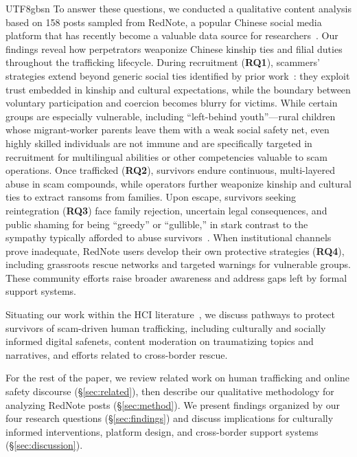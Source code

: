 \documentclass[sigconf,nonacm]{acmart}
\newcommand{\rev}[1]{#1}
\begin{document}
\begin{CJK}{UTF8}{gbsn}
To answer these questions, we conducted a qualitative content analysis based on 158 posts sampled from RedNote, \rev{a popular Chinese social media platform that has recently become a valuable data source for researchers}~\cite{wan-chi25, deng-deng25, yuan2025love}. Our findings \rev{reveal how perpetrators weaponize Chinese kinship ties and filial duties throughout the trafficking lifecycle. During recruitment (\textbf{RQ1}), scammers' strategies extend beyond generic social ties identified by prior work~\cite{luong2025simple, lazarus2025assessing}: they exploit trust embedded in kinship and cultural expectations, while the boundary between voluntary participation and coercion becomes blurry for victims. While certain groups are especially vulnerable, including ``left-behind youth''---rural children whose migrant-worker parents leave them with a weak social safety net, even highly skilled individuals are not immune and are specifically targeted in recruitment for multilingual abilities or other competencies valuable to scam operations. Once trafficked (\textbf{RQ2}), survivors endure continuous, multi-layered abuse in scam compounds, while operators further weaponize kinship and cultural ties to extract ransoms from families. Upon escape, survivors seeking reintegration (\textbf{RQ3}) face family rejection, uncertain legal consequences, and public shaming for being ``greedy'' or ``gullible,'' in stark contrast to the sympathy typically afforded to abuse survivors~\cite{pevac2022online}. When institutional channels prove inadequate, RedNote users develop their own protective strategies (\textbf{RQ4}), including grassroots rescue networks and targeted warnings for vulnerable groups. These community efforts raise broader awareness and address gaps left by formal support systems.} 

Situating our work within the HCI literature~\cite{wash2020experts, razaq2021we, randazzo2023if, starbird2011voluntweeters}, we discuss pathways to protect survivors of scam-driven human trafficking, including culturally and socially informed digital safenets, content moderation on traumatizing topics and narratives, and efforts related to cross-border rescue.

For the rest of the paper, we review related work on human trafficking and online safety discourse (\S\ref{sec:related}), then describe our qualitative methodology for analyzing RedNote posts (\S\ref{sec:method}). We present findings organized by our four research questions (\S\ref{sec:findings}) and discuss implications for culturally informed interventions, platform design, and cross-border support systems (\S\ref{sec:discussion}).


\end{CJK}
\end{document}
